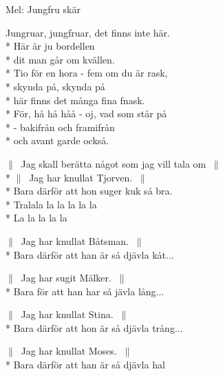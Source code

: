 \begin{SongText}[Bordellvisa]
    \begin{SongInfo}
        Mel: Jungfru skär
    \end{SongInfo}
    \begin{SongVerse}
        Jungruar, jungfruar, det finns inte här.\\*%
        Här är ju bordellen\\*%
        dit man går om kvällen.\\*%
        Tio för en hora - fem om du är rask,\\*%
        skynda på, skynda  på\\*%
        här finns det många fina fnask.\\*%
        För, hå hå håå - oj, vad som står på\\*%
        - bakifrån och framifrån\\*%
        och avant garde också.
    \end{SongVerse}
\end{SongText}
\begin{SongText}[Saltkråkan]
    \begin{SongVerse}
        $\|\:$ Jag skall berätta något som jag vill tala om $\:\|$\\*%
        $\|\:$ Jag har knullat Tjorven. $\:\|$\\*%
        Bara därför att hon suger kuk så bra.\\*%
        Tralala la la la la la\\*%
        La la la la la
    \end{SongVerse}
    \begin{SongVerse}
        $\|\:$ Jag har knullat Båtsman. $\:\|$\\*%
        Bara därför att han är så djävla kåt...
    \end{SongVerse}
    \begin{SongVerse}
        $\|\:$ Jag har sugit Mälker. $\:\|$\\*%
        Bara för att han har så jävla lång...
    \end{SongVerse}
    \begin{SongVerse}
        $\|\:$ Jag har knullat Stina. $\:\|$\\*%
        Bara därför att hon är så djävla trång...
    \end{SongVerse}
    \begin{SongVerse}
        $\|\:$ Jag har knullat Moses. $\:\|$\\*%
        Bara därför att han är så djävla hal
    \end{SongVerse}
\end{SongText}
